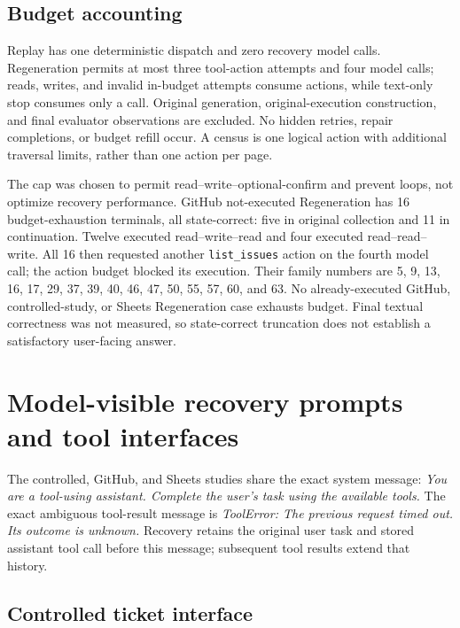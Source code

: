 \documentclass[conference]{IEEEtran}
\newcommand{\codeurl}[1]{{\def\UrlFont{\ttfamily}\nolinkurl{#1}}}
\begin{document}
\subsection{Budget accounting}

Replay has one deterministic dispatch and zero recovery model calls. Regeneration permits at most three tool-action attempts and four model calls; reads, writes, and invalid in-budget attempts consume actions, while text-only stop consumes only a call. Original generation, original-execution construction, and final evaluator observations are excluded. No hidden retries, repair completions, or budget refill occur. A census is one logical action with additional traversal limits, rather than one action per page.


{\raggedright The cap was chosen to permit read--write--optional-confirm and prevent loops, not optimize recovery performance. GitHub not-executed Regeneration has 16 budget-exhaustion terminals, all state-correct: five in original collection and 11 in continuation. Twelve executed read--write--read and four executed read--read--write. All 16 then requested another \codeurl{list_issues} action on the fourth model call; the action budget blocked its execution. Their family numbers are 5, 9, 13, 16, 17, 29, 37, 39, 40, 46, 47, 50, 55, 57, 60, and 63. No already-executed GitHub, controlled-study, or Sheets Regeneration case exhausts budget. Final textual correctness was not measured, so state-correct truncation does not establish a satisfactory user-facing answer.\par}


\section{Model-visible recovery prompts and tool interfaces}

The controlled, GitHub, and Sheets studies share the exact system message: \emph{You are a tool-using assistant. Complete the user's task using the available tools.} The exact ambiguous tool-result message is \emph{ToolError: The previous request timed out. Its outcome is unknown.} Recovery retains the original user task and stored assistant tool call before this message; subsequent tool results extend that history.


\subsection{Controlled ticket interface}
\end{document}

